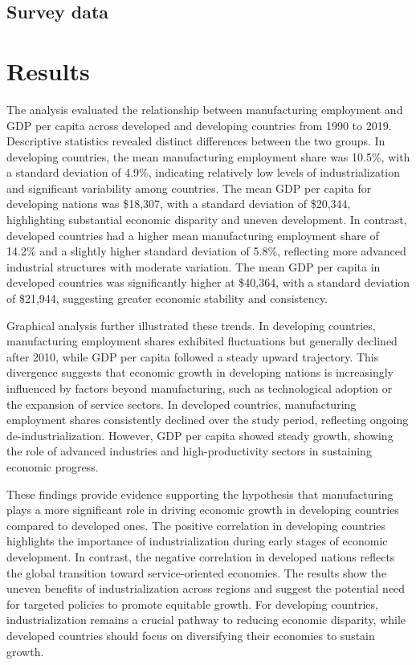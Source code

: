 \documentclass[12pt]{article}
\begin{document}
\subsection{Survey data}

\section{Results}
\label{sec:result}

The analysis evaluated the relationship between manufacturing employment and GDP per capita across developed and developing countries from 1990 to 2019. Descriptive statistics revealed distinct differences between the two groups. In developing countries, the mean manufacturing employment share was 10.5\%, with a standard deviation of 4.9\%, indicating relatively low levels of industrialization and significant variability among countries. The mean GDP per capita for developing nations was \$18,307, with a standard deviation of \$20,344, highlighting substantial economic disparity and uneven development. In contrast, developed countries had a higher mean manufacturing employment share of 14.2\% and a slightly higher standard deviation of 5.8\%, reflecting more advanced industrial structures with moderate variation. The mean GDP per capita in developed countries was significantly higher at \$40,364, with a standard deviation of \$21,944, suggesting greater economic stability and consistency.

Graphical analysis further illustrated these trends. In developing countries, manufacturing employment shares exhibited fluctuations but generally declined after 2010, while GDP per capita followed a steady upward trajectory. This divergence suggests that economic growth in developing nations is increasingly influenced by factors beyond manufacturing, such as technological adoption or the expansion of service sectors. In developed countries, manufacturing employment shares consistently declined over the study period, reflecting ongoing de-industrialization. However, GDP per capita showed steady growth, showing the role of advanced industries and high-productivity sectors in sustaining economic progress.

These findings provide evidence supporting the hypothesis that manufacturing plays a more significant role in driving economic growth in developing countries compared to developed ones. The positive correlation in developing countries highlights the importance of industrialization during early stages of economic development. In contrast, the negative correlation in developed nations reflects the global transition toward service-oriented economies. The results show the uneven benefits of industrialization across regions and suggest the potential need for targeted policies to promote equitable growth. For developing countries, industrialization remains a crucial pathway to reducing economic disparity, while developed countries should focus on diversifying their economies to sustain growth.
\end{document}
